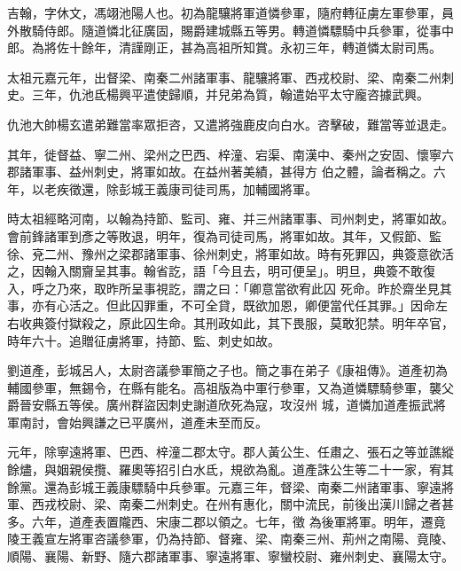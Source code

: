 
\begin{pinyinscope}

 吉翰，字休文，馮翊池陽人也。初為龍驤將軍道憐參軍，隨府轉征虜左軍參軍，員外散騎侍郎。隨道憐北征廣固，賜爵建城縣五等男。轉道憐驃騎中兵參軍，從事中
 郎。為將佐十餘年，清謹剛正，甚為高祖所知賞。永初三年，轉道憐太尉司馬。



 太祖元嘉元年，出督梁、南秦二州諸軍事、龍驤將軍、西戎校尉、梁、南秦二州刺史。三年，仇池氐楊興平遣使歸順，并兒弟為質，翰遣始平太守龐咨據武興。



 仇池大帥楊玄遣弟難當率眾拒咨，又遣將強鹿皮向白水。咨擊破，難當等並退走。



 其年，徙督益、寧二州、梁州之巴西、梓潼、宕渠、南漢中、秦州之安固、懷寧六郡諸軍事、益州刺史，將軍如故。在益州著美績，甚得方
 伯之體，論者稱之。六年，以老疾徵還，除彭城王義康司徒司馬，加輔國將軍。



 時太祖經略河南，以翰為持節、監司、雍、并三州諸軍事、司州刺史，將軍如故。會前鋒諸軍到彥之等敗退，明年，復為司徒司馬，將軍如故。其年，又假節、監徐、兗二州、豫州之梁郡諸軍事、徐州刺史，將軍如故。時有死罪囚，典簽意欲活之，因翰入關齎呈其事。翰省訖，語「今且去，明可便呈」。明旦，典簽不敢復入，呼之乃來，取昨所呈事視訖，謂之曰：「卿意當欲宥此囚
 死命。昨於齋坐見其事，亦有心活之。但此囚罪重，不可全貸，既欲加恩，卿便當代任其罪。」因命左右收典簽付獄殺之，原此囚生命。其刑政如此，其下畏服，莫敢犯禁。明年卒官，時年六十。追贈征虜將軍，持節、監、刺史如故。



 劉道產，彭城呂人，太尉咨議參軍簡之子也。簡之事在弟子《康祖傳》。道產初為輔國參軍，無錫令，在縣有能名。高祖版為中軍行參軍，又為道憐驃騎參軍，襲父爵晉安縣五等侯。廣州群盜因刺史謝道欣死為寇，攻沒州
 城，道憐加道產振武將軍南討，會始興謙之已平廣州，道產未至而反。



 元年，除寧遠將軍、巴西、梓潼二郡太守。郡人黃公生、任肅之、張石之等並譙縱餘燼，與姻親侯攬、羅奧等招引白水氐，規欲為亂。道產誅公生等二十一家，宥其餘黨。還為彭城王義康驃騎中兵參軍。元嘉三年，督梁、南秦二州諸軍事、寧遠將軍、西戎校尉、梁、南秦二州刺史。在州有惠化，關中流民，前後出漢川歸之者甚多。六年，道產表置隴西、宋康二郡以領之。七年，徵
 為後軍將軍。明年，遷竟陵王義宣左將軍咨議參軍，仍為持節、督雍、梁、南秦三州、荊州之南陽、竟陵、順陽、襄陽、新野、隨六郡諸軍事、寧遠將軍、寧蠻校尉、雍州刺史、襄陽太守。




\end{pinyinscope}
